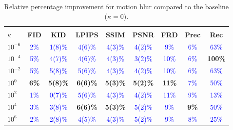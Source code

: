 \documentclass[twoside,11pt]{article}
\begin{document}
\begin{table}[ht!]
\centering
\renewcommand{\arraystretch}{1.4}
\setlength{\tabcolsep}{6pt}
\small
\begin{tabular}{lcccccccc}
\toprule
\rowcolor{gray!20}
\multicolumn{9}{c}{\textbf{Motion Blur - Relative Improvement}} \\
\textbf{$\kappa$} & \textbf{FID} & \textbf{KID} & \textbf{LPIPS} & \textbf{SSIM} & \textbf{PSNR} & \textbf{FRD} & \textbf{Prec} & \textbf{Rec} \\
\midrule
$10^{-6}$    & \textcolor{blue}{2\%} & \textcolor{blue}{1(8)\%} & \textcolor{blue}{4(6)\%} & \textcolor{blue}{4(3)\%} & \textcolor{blue}{4(2)\%} & \textcolor{blue}{9\%} & \textcolor{blue}{6\%} & \textcolor{blue}{63\%} \\
$10^{-4}$    & \textcolor{blue}{5\%} & \textcolor{blue}{4(7)\%} & \textcolor{blue}{4(6)\%} & \textcolor{blue}{4(3)\%} & \textcolor{blue}{3(2)\%} & \textcolor{blue}{10\%} & \textcolor{blue}{6\%} & \textbf{\textcolor{green!50!black}{100\%}} \\
$10^{-2}$    & \textcolor{blue}{5\%} & \textcolor{blue}{5(8)\%} & \textcolor{blue}{5(6)\%} & \textcolor{blue}{4(3)\%} & \textcolor{blue}{4(2)\%} & \textcolor{blue}{10\%} & \textcolor{blue}{6\%} & \textcolor{blue}{63\%}  \\
$10^{0}$     & \textbf{\textcolor{green!50!black}{6\%}} & \textbf{\textcolor{green!50!black}{5(8)\%}} & \textbf{\textcolor{green!50!black}{6(6)\%}} & \textbf{\textcolor{green!50!black}{5(3)\%}} & \textbf{\textcolor{green!50!black}{5(2)\%}} & \textbf{\textcolor{green!50!black}{11\%}} & \textcolor{blue}{7\%} & \textcolor{blue}{50\%} \\
$10^{2}$     & \textcolor{blue}{1\%} & \textcolor{blue}{0(7)\%} & \textcolor{blue}{5(6)\%} & \textcolor{blue}{4(3)\%} & \textcolor{blue}{4(2)\%} & \textcolor{blue}{11\%} & \textcolor{blue}{9\%} & \textcolor{blue}{13\%} \\
$10^{4}$     & \textcolor{blue}{3\%} & \textcolor{blue}{3(8)\%} & \textbf{\textcolor{green!50!black}{6(6)\%}} & \textbf{\textcolor{green!50!black}{5(3)\%}} & \textcolor{blue}{5(2)\%} & \textcolor{blue}{9\%} & \textbf{\textcolor{green!50!black}{9\%}} & \textcolor{blue}{50\%} \\
$10^{6}$     & \textcolor{blue}{2\%} & \textcolor{blue}{2(8)\%} & \textcolor{blue}{4(5)\%} & \textcolor{blue}{4(3)\%} & \textcolor{blue}{5(2)\%} & \textcolor{blue}{9\%} & \textcolor{blue}{8\%} & \textcolor{blue}{25\%} \\
\bottomrule
\end{tabular}
\caption{Relative percentage improvement for motion blur compared to the baseline ($\kappa = 0$).}
\label{tab:robustness_motion_blur_rel}
\end{table}
\end{document}
